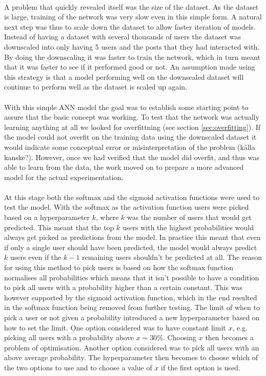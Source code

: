 \\
A problem that quickly revealed itself was the size of the dataset. As the dataset is large, training of the network was very slow even in this simple form. A natural next step was thus to scale down the dataset to allow faster iteration of models. Instead of having a dataset with several thousands of users the dataset was downscaled into only having 5 users and the posts that they had interacted with. By doing the downscaling it was faster to train the network, which in turn meant that it was faster to see if it performed good or not. An assumption made using this strategy is that a model performing well on the downscaled dataset will continue to perform well as the dataset is scaled up again. 
\\\\
With this simple ANN model the goal was to establish some starting point to assure that the basic concept was working. To test that the network was actually learning anything at all we looked for overfittning (see section \ref{sec:overfitting}). If the model could not overfit on the training data using the downscaled dataset it would indicate some conceptual error or misinterpretation of the problem (källa kanske?). However, once we had verified that the model did overfit, and thus was able to learn from the data, the work moved on to prepare a more advanced model for the actual experimentation.
\\\\
At this stage both the softmax and the sigmoid activation functions were used to test the model. With the softmax as the activation function users were picked based on a hyperparameter $k$, where $k$ was the number of users that would get predicted. This meant that the top $k$ users with the highest probabilities would always get picked as predictions from the model. In practice this meant that even if only a single user should have been predicted, the model would always predict $k$ users even if the $k-1$ remaining users shouldn't be predicted at all. The reason for using this method to pick users is based on how the softmax function normalises all probabilities which means that it isn't possible to have a condition to pick all users with a probability higher than a certain constant. This was however supported by the sigmoid activation function, which in the end resulted in the softmax function being removed from further testing. The limit of when to pick a user or not given a probability introduced a new hyperparameter based on how to set the limit. One option considered was to have constant limit $x$, e.g. picking all users with a probability above $x=30\%$. Choosing $x$ then becomes a problem of optimisation. Another option considered was to pick all users with an above average probability. The hyperparameter then becomes to choose which of the two options to use and to choose a value of $x$ if the first option is used.
